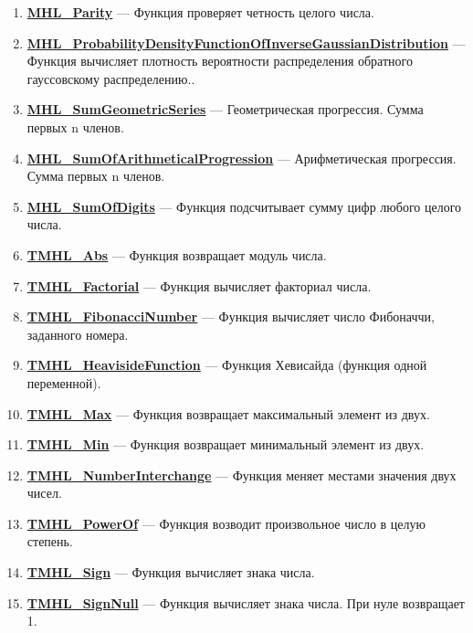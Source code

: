\documentclass[a4paper,12pt]{article}
\begin{document}
\begin{enumerate}
\item \textbf{\hyperref[MHL_Parity]{MHL\_Parity}} --- Функция проверяет четность целого числа.

\item \textbf{\hyperref[MHL_ProbabilityDensityFunctionOfInverseGaussianDistribution]{MHL\_ProbabilityDensityFunctionOfInverseGaussianDistribution}} --- Функция вычисляет плотность вероятности распределения обратного гауссовскому распределению..

\item \textbf{\hyperref[MHL_SumGeometricSeries]{MHL\_SumGeometricSeries}} --- Геометрическая прогрессия. Сумма первых n членов.

\item \textbf{\hyperref[MHL_SumOfArithmeticalProgression]{MHL\_SumOfArithmeticalProgression}} --- Арифметическая прогрессия. Сумма первых n членов.

\item \textbf{\hyperref[MHL_SumOfDigits]{MHL\_SumOfDigits}} --- Функция подсчитывает сумму цифр любого целого числа.

\item \textbf{\hyperref[TMHL_Abs]{TMHL\_Abs}} --- Функция возвращает модуль числа.

\item \textbf{\hyperref[TMHL_Factorial]{TMHL\_Factorial}} --- Функция вычисляет факториал числа.

\item \textbf{\hyperref[TMHL_FibonacciNumber]{TMHL\_FibonacciNumber}} --- Функция вычисляет число Фибоначчи, заданного номера.

\item \textbf{\hyperref[TMHL_HeavisideFunction]{TMHL\_HeavisideFunction}} --- Функция Хевисайда (функция одной переменной).

\item \textbf{\hyperref[TMHL_Max]{TMHL\_Max}} --- Функция возвращает максимальный элемент из двух.

\item \textbf{\hyperref[TMHL_Min]{TMHL\_Min}} --- Функция возвращает минимальный элемент из двух.

\item \textbf{\hyperref[TMHL_NumberInterchange]{TMHL\_NumberInterchange}} --- Функция меняет местами значения двух чисел.

\item \textbf{\hyperref[TMHL_PowerOf]{TMHL\_PowerOf}} --- Функция возводит произвольное число в целую степень.

\item \textbf{\hyperref[TMHL_Sign]{TMHL\_Sign}} --- Функция вычисляет знака числа.

\item \textbf{\hyperref[TMHL_SignNull]{TMHL\_SignNull}} --- Функция вычисляет знака числа. При нуле возвращает 1.

\end{enumerate}
\end{document}
